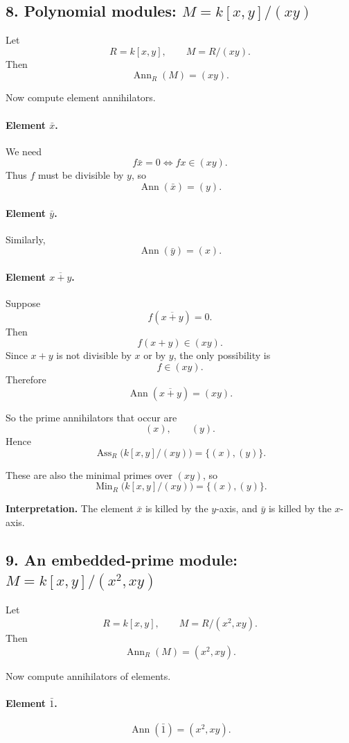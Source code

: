 \documentclass[12pt,a4paper,oneside]{report}
\DeclareMathOperator{\Ass}{Ass}
\DeclareMathOperator{\Ann}{Ann}
\DeclareMathOperator{\Min}{Min}
\theoremstyle{notespace}
\begin{document}
	\subsection{8. Polynomial modules: \(M=k[x,y]/(xy)\)}
	
	Let
	\[
	R=k[x,y],\qquad M=R/(xy).
	\]
	Then
	\[
	\Ann_R(M)=(xy).
	\]
	
	Now compute element annihilators.
	
	\paragraph{Element \(\bar x\).}
	We need
	\[
	f\bar x=0 \iff fx\in (xy).
	\]
	Thus \(f\) must be divisible by \(y\), so
	\[
	\Ann(\bar x)=(y).
	\]
	
	\paragraph{Element \(\bar y\).}
	Similarly,
	\[
	\Ann(\bar y)=(x).
	\]
	
	\paragraph{Element \(\overline{x+y}\).}
	Suppose
	\[
	f(\overline{x+y})=0.
	\]
	Then
	\[
	f(x+y)\in (xy).
	\]
	Since \(x+y\) is not divisible by \(x\) or by \(y\), the only possibility is
	\[
	f\in (xy).
	\]
	Therefore
	\[
	\Ann(\overline{x+y})=(xy).
	\]
	
	So the prime annihilators that occur are
	\[
	(x),\qquad (y).
	\]
	Hence
	\[
	\Ass_R\bigl(k[x,y]/(xy)\bigr)=\{(x),(y)\}.
	\]
	
	These are also the minimal primes over \((xy)\), so
	\[
	\Min_R\bigl(k[x,y]/(xy)\bigr)=\{(x),(y)\}.
	\]
	
	\medskip
	
	\noindent
	\textbf{Interpretation.}
	The element \(\bar x\) is killed by the \(y\)-axis, and \(\bar y\) is killed by the \(x\)-axis.
	
	\subsection{9. An embedded-prime module: \(M=k[x,y]/(x^2,xy)\)}
	
	Let
	\[
	R=k[x,y],\qquad M=R/(x^2,xy).
	\]
	Then
	\[
	\Ann_R(M)=(x^2,xy).
	\]
	
	Now compute annihilators of elements.
	
	\paragraph{Element \(\bar 1\).}
	\[
	\Ann(\bar 1)=(x^2,xy).
	\]
	
\end{document}
